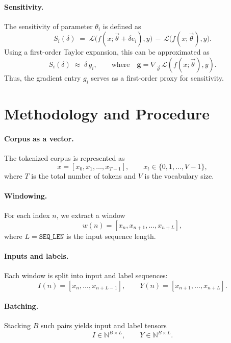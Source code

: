 \documentclass[12pt]{article}
\begin{document}
\paragraph{Sensitivity.}
The sensitivity of parameter $\theta_i$ is defined as
\begin{equation}
  S_i(\delta) \;=\; \mathcal{L}\!\big(f(x;\vec{\theta}+\delta e_i),y\big) \,-\, \mathcal{L}\!\big(f(x;\vec{\theta}),y\big).
\end{equation}
Using a first-order Taylor expansion, this can be approximated as
\begin{equation}
  S_i(\delta) \;\approx\; \delta \, g_i,
  \qquad \text{where}\quad \bm{g} = \nabla_{\vec{\theta}}\,\mathcal{L}(f(x;\vec{\theta}),y).
\end{equation}
Thus, the gradient entry $g_i$ serves as a first-order proxy for sensitivity.

\section{Methodology and Procedure}

\paragraph{Corpus as a vector.} 
The tokenized corpus is represented as
\[
x = [x_0, x_1, \ldots, x_{T-1}], \qquad x_t \in \{0,1,\ldots,V-1\},
\]
where $T$ is the total number of tokens and $V$ is the vocabulary size.

\paragraph{Windowing.} 
For each index $n$, we extract a window
\[
w(n) = [x_n, x_{n+1}, \ldots, x_{n+L}],
\]
where $L = \texttt{SEQ\_LEN}$ is the input sequence length.

\paragraph{Inputs and labels.} 
Each window is split into input and label sequences:
\[
I(n) = [x_n, \ldots, x_{n+L-1}], \qquad 
Y(n) = [x_{n+1}, \ldots, x_{n+L}].
\]

\paragraph{Batching.} 
Stacking $B$ such pairs yields input and label tensors
\[
I \in \mathbb{N}^{B \times L}, 
\qquad 
Y \in \mathbb{N}^{B \times L}.
\]
\end{document}
